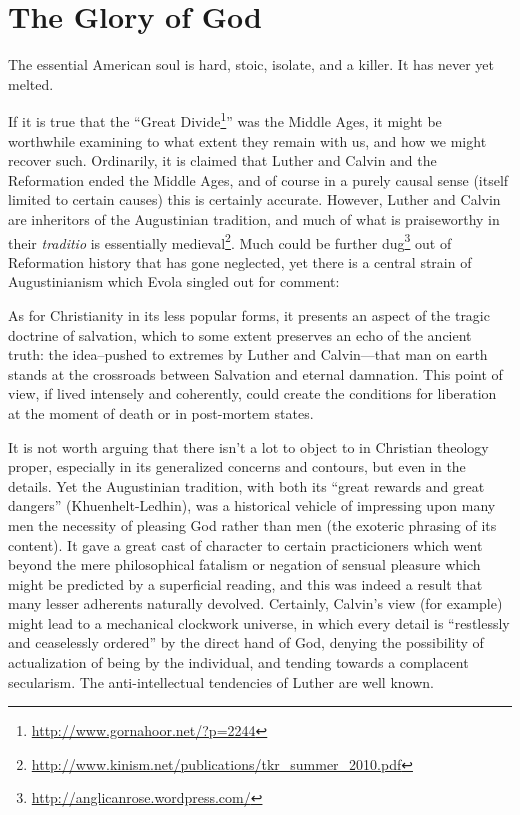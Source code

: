 \section{The Glory of God}

\begin{quotex}
The essential American soul is hard, stoic, isolate, and a killer. It has never yet melted. 
\end{quotex}

If it is true that the ``Great Divide\footnote{\url{http://www.gornahoor.net/?p=2244}}'' was the Middle Ages, it might be worthwhile examining to what extent they remain with us, and how we might recover such. Ordinarily, it is claimed that Luther and Calvin and the Reformation ended the Middle Ages, and of course in a purely causal sense (itself limited to certain causes) this is certainly accurate. However, Luther and Calvin are inheritors of the Augustinian tradition, and much of what is praiseworthy in their \emph{traditio} is essentially medieval\footnote{\url{http://www.kinism.net/publications/tkr_summer_2010.pdf}}. Much could be further dug\footnote{\url{http://anglicanrose.wordpress.com/}} out of Reformation history that has gone neglected, yet there is a central strain of Augustinianism which Evola singled out for comment:

\begin{quotex}
As for Christianity in its less popular forms, it presents an aspect of the tragic doctrine of salvation, which to some extent preserves an echo of the ancient truth: the idea--pushed to extremes by Luther and Calvin---that man on earth stands at the crossroads between Salvation and eternal damnation. This point of view, if lived intensely and coherently, could create the conditions for liberation at the moment of death or in post-mortem states.

\end{quotex}


It is not worth arguing that there isn't a lot to object to in Christian theology proper, especially in its generalized concerns and contours, but even in the details. Yet the Augustinian tradition, with both its ``great rewards and great dangers'' (Khuenhelt-Ledhin), was a historical vehicle of impressing upon many men the necessity of pleasing God rather than men (the exoteric phrasing of its content). It gave a great cast of character to certain practicioners which went beyond the mere philosophical fatalism or negation of sensual pleasure which might be predicted by a superficial reading, and this was indeed a result that many lesser adherents naturally devolved. Certainly, Calvin's view (for example) might lead to a mechanical clockwork universe, in which every detail is ``restlessly and ceaselessly ordered'' by the direct hand of God, denying the possibility of actualization of being by the individual, and tending towards a complacent secularism. The anti-intellectual tendencies of Luther are well known.

